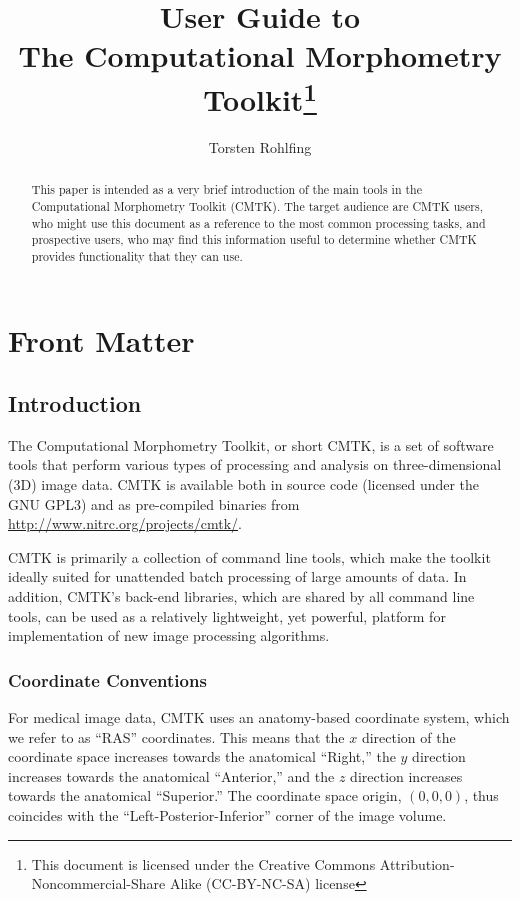 \documentclass{InsightArticle}
\title{User Guide to \\[4mm] The Computational Morphometry
  Toolkit\footnote{This document is licensed under
    the Creative Commons Attribution-Noncommercial-Share Alike (CC-BY-NC-SA) license}}
\author{Torsten Rohlfing}
\begin{document}
\maketitle

\ifhtml
\chapter*{Front Matter\label{front}}
\fi


\begin{abstract}
\noindent
This paper is intended as a very brief introduction of the main tools in the
Computational Morphometry Toolkit (CMTK). The target audience are CMTK users,
who might use this document as a reference to the most common processing
tasks, and prospective users, who may find this information useful to
determine whether CMTK provides functionality that they can use.
\end{abstract}

\clearpage
\tableofcontents
\clearpage


\section{Introduction}

The Computational Morphometry Toolkit, or short CMTK, is a set of software
tools that perform various types of processing and analysis on
three-dimensional (3D) image data. CMTK is available both in source code
(licensed under the GNU GPL3) and as pre-compiled binaries from
\url{http://www.nitrc.org/projects/cmtk/}.

CMTK is primarily a collection of command line tools, which make the toolkit
ideally suited for unattended batch processing of large amounts of data. In
addition, CMTK's back-end libraries, which are shared by all command line
tools, can be used as a relatively lightweight, yet powerful, platform for
implementation of new image processing algorithms.

\subsection{Coordinate Conventions}

For medical image data, CMTK uses an anatomy-based coordinate system, which we
refer to as ``RAS'' coordinates. This means that the $x$ direction of the
coordinate space increases towards the anatomical ``Right,'' the $y$ direction
increases towards the anatomical ``Anterior,'' and the $z$ direction increases
towards the anatomical ``Superior.'' The coordinate space origin, $(0,0,0)$,
thus coincides with the ``Left-Posterior-Inferior'' corner of the image
volume. 
\end{document}
